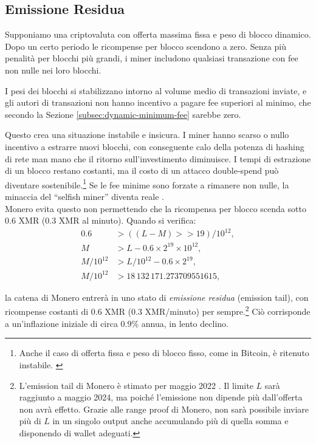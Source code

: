 \subsection{Emissione Residua}
\label{subsec:emission-tail}

Supponiamo una criptovaluta con offerta massima fissa e peso di blocco dinamico. Dopo un certo periodo le ricompense per blocco scendono a zero. Senza più penalità per blocchi più grandi, i miner includono qualsiasi transazione con fee non nulle nei loro blocchi.

I pesi dei blocchi si stabilizzano intorno al volume medio di transazioni inviate, e gli autori di transazioni non hanno incentivo a pagare fee superiori al minimo, che secondo la Sezione \ref{subsec:dynamic-minimum-fee} sarebbe zero.

Questo crea una situazione instabile e insicura. I miner hanno scarso o nullo incentivo a estrarre nuovi blocchi, con conseguente calo della potenza di hashing di rete man mano che il ritorno sull’investimento diminuisce. I tempi di estrazione di un blocco restano costanti, ma il costo di un attacco double-spend può diventare sostenibile.\footnote{Anche il caso di offerta fissa e peso di blocco fisso, come in Bitcoin, è ritenuto instabile. \cite{no-reward-instability}} Se le fee minime sono forzate a rimanere non nulle, la minaccia del “selfish miner” \cite{selfish-miner} diventa reale \cite{no-reward-instability}.\\

Monero evita questo non permettendo che la ricompensa per blocco scenda sotto 0.6 XMR (0.3 XMR al minuto). Quando si verifica:\vspace{.175cm}
\begin{align*}
               0.6 &> ((L-M) >> 19)/10^{12}, \\
        M &> L - 0.6 \times 2^{19} \times 10^{12}, \\
        M/10^{12} &> L/10^{12} - 0.6 \times 2^{19}, \\
        M/10^{12} &> 18\,132\,171.273709551615,
\end{align*}

la catena di Monero entrerà in uno stato di \emph{emissione residua} (emission tail), con ricompense costanti di 0.6 XMR (0.3 XMR/minuto) per sempre.\footnote{L’emission tail di Monero è stimato per maggio 2022 \cite{monero-tail-emission}. Il limite $L$ sarà raggiunto a maggio 2024, ma poiché l’emissione non dipende più dall’offerta non avrà effetto. Grazie alle range proof di Monero, non sarà possibile inviare più di $L$ in un singolo output anche accumulando più di quella somma e disponendo di wallet adeguati.} Ciò corrisponde a un’inflazione iniziale di circa 0.9\% annua, in lento declino.


